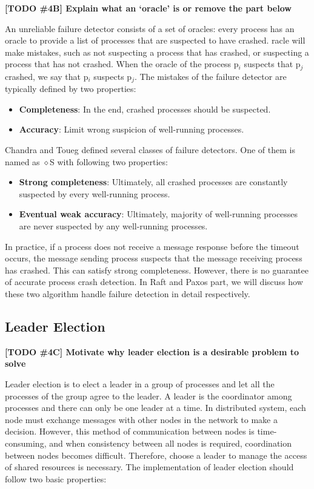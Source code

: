 \documentclass[12pt, a4paper]{article}
\newcommand{\todo}[2]{\textbf{\color{blue}[TODO \##1] #2}\par}
\begin{document}
\todo{4B}{Explain what an `oracle' is or remove the part below}

An unreliable failure detector consists of a set of oracles: every process has
an oracle to provide a list of processes that are suspected to have crashed.
racle will make mistakes, such as not suspecting a process that has crashed, or
suspecting a process that has not crashed. When the oracle of the process
p$_{i}$ suspects that p$_{j}$ crashed, we say that p$_{i}$ suspects p$_{j}$.
The mistakes of the failure detector are typically defined by two properties:

\begin{itemize}
  \item \textbf{Completeness}: In the end, crashed processes should be
  suspected.
  \item \textbf{Accuracy}: Limit wrong suspicion of well-running processes.
\end{itemize}

Chandra and Toueg\cite{chandra1996unreliable} defined several classes of failure
detectors. One of them is named as $\diamond$S with following two properties:

\begin{itemize}
  \item \textbf{Strong completeness}: Ultimately, all crashed processes are
  constantly suspected by every well-running process.
  \item \textbf{Eventual weak accuracy}: Ultimately, majority of well-running
  processes are never suspected by any well-running processes.
\end{itemize}

In practice, if a process does not receive a message response before the timeout occurs, the message sending process suspects that the message receiving process has crashed. This can satisfy strong completeness. However, there is no guarantee of accurate process crash detection. In Raft and Paxos part, we will discuss how these two algorithm handle failure detection in detail respectively.

\subsection{Leader Election}
\todo{4C}{Motivate why leader election is a desirable problem to solve}
Leader election is to elect a leader in a group of processes and let all the processes of the group agree to the leader. A leader is the coordinator among processes and there can only be one leader at a time. In distributed system, each node must exchange messages with other nodes in the network to make a decision. However, this method of communication between nodes is time-consuming, and when consistency between all nodes is required, coordination between nodes becomes difficult. Therefore, choose a leader to manage the access of shared resources is necessary. The implementation of leader election should follow two basic properties\cite{nugraheni2009formal}:
\end{document}
